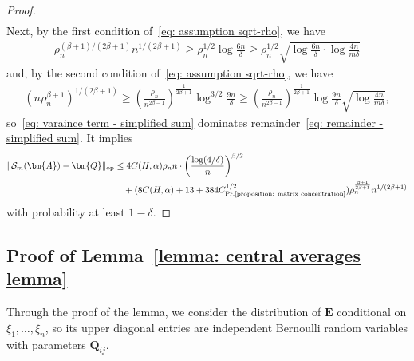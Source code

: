 \documentclass[11pt]{article}
\newcommand{\op}{\mathrm{op}}
\newcommand{\bA}{\bm{A}}
\newcommand{\bQ}{\bm{Q}}
\newcommand{\bE}{\bm{E}}
\newcommand{\constantBandeira}{C_{\text{Pr.\ref{proposition: matrix concentration}}}}
\newcommand{\<}{\langle}
\renewcommand{\>}{\rangle}
\newcommand{\cS}{\mathcal{S}}
\theoremstyle{plain}
\theoremstyle{definition}
\theoremstyle{remark}
\begin{document}
{\begin{proof}
\begin{align}
\end{align}
Next, by the first condition of~\eqref{eq: assumption sqrt-rho}, we have
\begin{align*}
    \rho_n^{(\beta + 1)/(2 \beta + 1)} n^{1/(2\beta + 1)} \ge \rho_n^{1/2} \log \frac{6n}{\delta} \ge \rho_n^{1/2} \sqrt{\log \frac{6 n}{\delta} \cdot \log \frac{4n}{m \delta}}
\end{align*}
and, by the second condition of~\eqref{eq: assumption sqrt-rho}, we have
\begin{align*}
    (n \rho_n^{\beta + 1})^{1/(2 \beta + 1)} \ge \left ( \frac{\rho_n}{n^{2 \beta - 1}} \right )^{\frac{1}{2 \beta + 1}} \log^{3/2} \frac{9n}{\delta} \ge \left ( \frac{\rho_n}{n^{2 \beta - 1}} \right )^{\frac{1}{2 \beta + 1}} \log \frac{9n}{\delta} \sqrt{\log \frac{4n}{m \delta}},
\end{align*}
so~\eqref{eq: varaince term - simplified sum} dominates remainder~\eqref{eq: remainder - simplified sum}. It implies
\begin{align*}
    \Vert \cS_m(\bA) - \bQ \Vert_{\op} & \le4 C(H, \alpha)   \rho_n n \cdot \left ( \frac{\log(4/\delta)}{n} \right )^{\beta/2} \\
    & \quad + (8 C(H, \alpha) + 13 + 384 \constantBandeira^{1/2})\rho_n^{\frac{\beta + 1}{2 \beta + 1}} n^{1/(2 \beta + 1) 
    }
\end{align*}
with probability at least $1- \delta$.
\end{proof}

\subsection{Proof of Lemma~\ref{lemma: central averages lemma}}
\label{section: proof of averages operator norm concentration}

Through the proof of the lemma, we consider the distribution of $\bE$ conditional on $\xi_1, \ldots, \xi_n$, so its upper diagonal entries are independent Bernoulli random variables with parameters $\bQ_{ij}$. 

}
\end{document}
